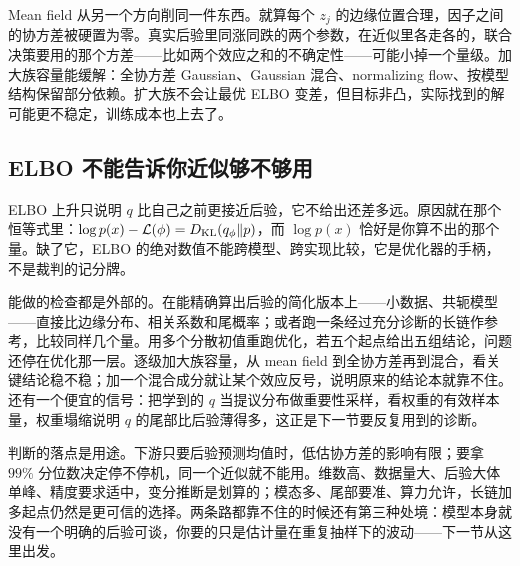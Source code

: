Mean field 从另一个方向削同一件东西。就算每个 \(z_j\) 的边缘位置合理，因子之间的协方差被硬置为零。真实后验里同涨同跌的两个参数，在近似里各走各的，联合决策要用的那个方差——比如两个效应之和的不确定性——可能小掉一个量级。加大族容量能缓解：全协方差 Gaussian、Gaussian 混合、normalizing flow、按模型结构保留部分依赖。扩大族不会让最优 ELBO 变差，但目标非凸，实际找到的解可能更不稳定，训练成本也上去了。

\subsection{ELBO 不能告诉你近似够不够用}

ELBO 上升只说明 \(q\) 比自己之前更接近后验，它不给出还差多远。原因就在那个恒等式里：\(\log p(x)-\mathcal L(\phi)=D_{\mathrm{KL}}(q_\phi\|p)\)，而 \(\log p(x)\) 恰好是你算不出的那个量。缺了它，ELBO 的绝对数值不能跨模型、跨实现比较，它是优化器的手柄，不是裁判的记分牌。

能做的检查都是外部的。在能精确算出后验的简化版本上——小数据、共轭模型——直接比边缘分布、相关系数和尾概率；或者跑一条经过充分诊断的长链作参考，比较同样几个量。用多个分散初值重跑优化，若五个起点给出五组结论，问题还停在优化那一层。逐级加大族容量，从 mean field 到全协方差再到混合，看关键结论稳不稳；加一个混合成分就让某个效应反号，说明原来的结论本就靠不住。还有一个便宜的信号：把学到的 \(q\) 当提议分布做重要性采样，看权重的有效样本量，权重塌缩说明 \(q\) 的尾部比后验薄得多，这正是下一节要反复用到的诊断。

判断的落点是用途。下游只要后验预测均值时，低估协方差的影响有限；要拿 \(99\%\) 分位数决定停不停机，同一个近似就不能用。维数高、数据量大、后验大体单峰、精度要求适中，变分推断是划算的；模态多、尾部要准、算力允许，长链加多起点仍然是更可信的选择。两条路都靠不住的时候还有第三种处境：模型本身就没有一个明确的后验可谈，你要的只是估计量在重复抽样下的波动——下一节从这里出发。
